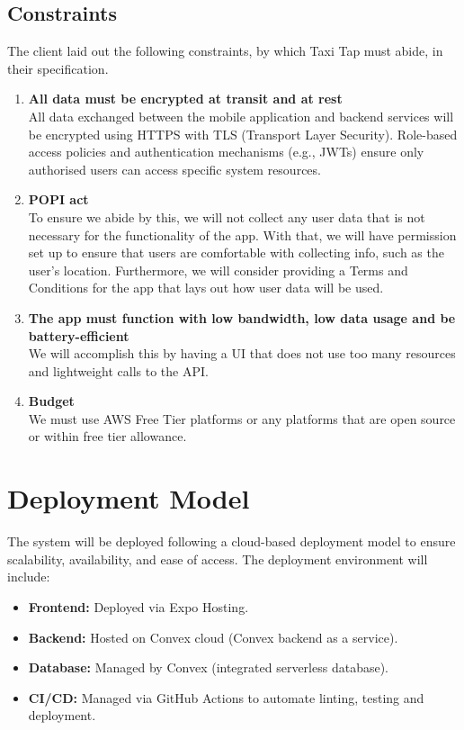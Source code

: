 \documentclass[a4paper,12pt]{article}
\begin{document}
\subsection{Constraints}
The client laid out the following constraints, by which Taxi Tap must abide, in their specification.

\begin{enumerate}
    \item \textbf{All data must be encrypted at transit and at rest}\\
    All data exchanged between the mobile application and backend services will be encrypted using HTTPS with TLS (Transport Layer Security). Role-based access policies and authentication mechanisms (e.g., JWTs) ensure only authorised users can access specific system resources.

    \item \textbf{POPI act}\\
    To ensure we abide by this, we will not collect any user data that is not necessary for the functionality of the app. With that, we will have permission set up to ensure that users are comfortable with collecting info, such as the user’s location. Furthermore, we will consider providing a Terms and Conditions for the app that lays out how user data will be used.

    \item \textbf{The app must function with low bandwidth, low data usage and be battery-efficient}\\
    We will accomplish this by having a UI that does not use too many resources and lightweight calls to the API.

    \item \textbf{Budget}\\
    We must use AWS Free Tier platforms or any platforms that are open source or within free tier allowance.
\end{enumerate}

\section{Deployment Model}
The system will be deployed following a cloud-based deployment model to ensure scalability, availability, and ease of access. The deployment environment will include:
\begin{itemize}
    \item \textbf{Frontend:} Deployed via Expo Hosting.
    \item \textbf{Backend:} Hosted on Convex cloud (Convex backend as a service).
    \item \textbf{Database:}  Managed by Convex (integrated serverless database).
    \item \textbf{CI/CD:} Managed via GitHub Actions to automate linting, testing and deployment.
\end{itemize}
\end{document}

